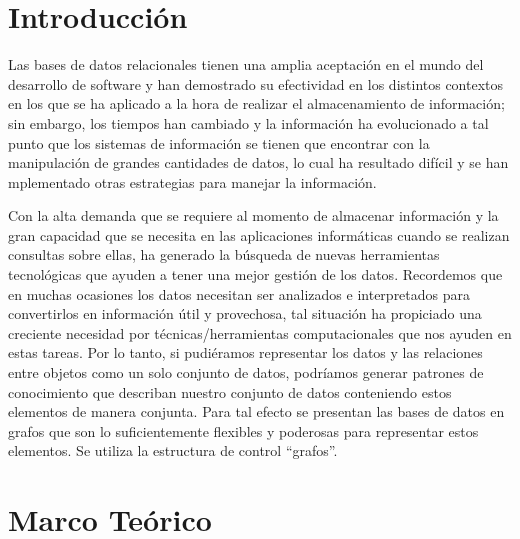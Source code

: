 \documentclass[preprint,12pt]{elsarticle}
\begin{document}



\section{Introducción} 

Las bases de datos relacionales tienen una amplia aceptación en el mundo del desarrollo de software y han demostrado su efectividad en los distintos contextos en los que se ha aplicado a la hora de realizar el almacenamiento de información; sin embargo, los tiempos han cambiado y la información ha evolucionado a tal punto que los sistemas de información se tienen que encontrar con la manipulación de grandes cantidades de datos, lo cual ha resultado difícil y se han
 mplementado otras estrategias para manejar la información.

Con la alta demanda que se requiere al momento de almacenar información y la gran capacidad que se necesita en las aplicaciones informáticas cuando se realizan consultas sobre ellas, ha generado la búsqueda de nuevas herramientas tecnológicas que ayuden a tener una mejor gestión de los datos. Recordemos que en muchas ocasiones los datos necesitan ser analizados e interpretados para convertirlos en información útil y provechosa, tal situación ha propiciado una creciente necesidad por técnicas/herramientas computacionales que nos ayuden en estas tareas. Por lo tanto, si pudiéramos representar los datos y las relaciones entre objetos como un solo conjunto de datos, podríamos generar patrones de conocimiento que describan nuestro conjunto de datos conteniendo estos elementos de manera conjunta. Para tal efecto se presentan las bases de datos en grafos que son lo suficientemente flexibles y poderosas para representar estos elementos. Se utiliza la estructura de control “grafos”.






\section{Marco Teórico}
\end{document}
